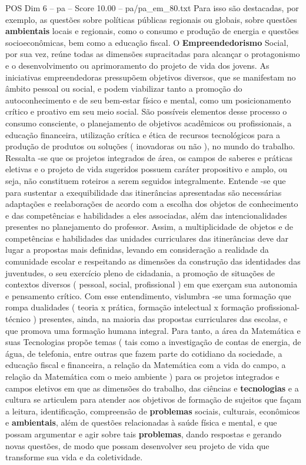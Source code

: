 \begin{textsample}{POS Dim 6 – pa – Score 10.00 – pa/pa\_em\_80.txt}
Para isso são destacadas, por exemplo, as questões sobre políticas públicas regionais ou globais, sobre questões \textbf{ambientais} locais e regionais, como o consumo e produção de energia e questões socioeconômicas, bem como a educação fiscal.
O \textbf{Empreendedorismo} Social, por sua vez, reúne todas as dimensões supracitadas para alcançar o protagonismo e o desenvolvimento ou aprimoramento do projeto de vida dos jovens.
As iniciativas empreendedoras pressupõem objetivos diversos, que se manifestam no âmbito pessoal ou social, e podem viabilizar tanto a promoção do autoconhecimento e de seu bem-estar físico e mental, como um posicionamento crítico e proativo em seu meio social.
São possíveis elementos desse processo o consumo consciente, o planejamento de objetivos acadêmicos ou profissionais, a educação financeira, utilização crítica e ética de recursos tecnológicos para a produção de produtos ou soluções ( inovadoras ou não ), no mundo do trabalho.
Ressalta -se que os projetos integrados de área, os campos de saberes e práticas eletivas e o projeto de vida sugeridos possuem caráter propositivo e amplo, ou seja, não constituem roteiros a serem seguidos integralmente.
Entende -se que para sustentar a exequibilidade das itinerâncias apresentadas são necessárias adaptações e reelaborações de acordo com a escolha dos objetos de conhecimento e das competências e habilidades a eles associadas, além das intencionalidades presentes no planejamento do professor.
Assim, a multiplicidade de objetos e de competências e habilidades das unidades curriculares das itinerâncias deve dar lugar a propostas mais definidas, levando em consideração a realidade da comunidade escolar e respeitando as dimensões da construção das identidades das juventudes, o seu exercício pleno de cidadania, a promoção de situações de contextos diversos ( pessoal, social, profissional ) em que exerçam sua autonomia e pensamento crítico.
Com esse entendimento, vislumbra -se uma formação que rompa dualidades ( teoria x prática, formação intelectual x formação profissional-técnico ) presentes, ainda, na maioria das propostas curriculares das escolas, e que promova uma formação humana integral.
Para tanto, a área da Matemática e suas Tecnologias propõe temas ( tais como a investigação de contas de energia, de água, de telefonia, entre outras que fazem parte do cotidiano da sociedade, a educação fiscal e financeira, a relação da Matemática com a vida do campo, a relação da Matemática com o meio ambiente ) para os projetos integrados e campos eletivos em que as dimensões do trabalho, das ciências e \textbf{tecnologias} e a cultura se articulem para atender aos objetivos de formação de sujeitos que façam a leitura, identificação, compreensão de \textbf{problemas} sociais, culturais, econômicos e \textbf{ambientais}, além de questões relacionadas à saúde física e mental, e que possam argumentar e agir sobre tais \textbf{problemas}, dando respostas e gerando novas questões, de modo que possam desenvolver seu projeto de vida que transforme sua vida e da coletividade.

\end{textsample}
